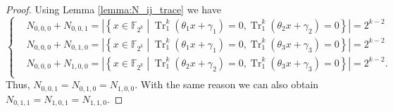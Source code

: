 \documentclass{article}
\newcommand{\F}{\mathbb{F}}
\newcommand{\0}{\textbf{0}}
\newcommand{\1}{\textbf{1}}
\newcommand{\TRACE}{\operatorname{Tr}_1^k}
\theoremstyle{plain}
\theoremstyle{nonumberplain}
\begin{document}
    \begin{proof}
        Using Lemma \ref{lemma:N_ij_trace} we have  
        \begin{equation}\label{eq:from_lemma_1}\left\{\begin{alignedat}{3}
        &N_{0,0,0}+N_{0,0,1}=\left\lvert\left\{x\in\F_{2^k}\middle|\TRACE\left(\theta_1x+\gamma_1\right)=0, \TRACE\left(\theta_2x+\gamma_2\right)=0\right\}\right\rvert=2^{k-2}\\
        &N_{0,0,0}+N_{0,1,0}=\left\lvert\left\{x\in\F_{2^k}\middle|\TRACE\left(\theta_1x+\gamma_1\right)=0, \TRACE\left(\theta_3x+\gamma_3\right)=0\right\}\right\rvert=2^{k-2}\\
        &N_{0,0,0}+N_{1,0,0}=\left\lvert\left\{x\in\F_{2^k}\middle|\TRACE\left(\theta_2x+\gamma_2\right)=0, \TRACE\left(\theta_3x+\gamma_3\right)=0\right\}\right\rvert=2^{k-2}.\\
        \end{alignedat}\right.\end{equation}
        Thus, $ N_{0,0,1}=N_{0,1,0}=N_{1,0,0} $. With the same reason we can also obtain  $ N_{0,1,1}=N_{1,0,1}=N_{1,1,0} $. 


\end{proof}
\end{document}
